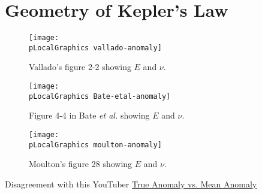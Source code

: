 % 

\section{Geometry of Kepler's Law}
\label{sec:geo}

\begin{figure}[htbp] %
\centering
\begin{center}
   \texttt{[image: \\pLocalGraphics vallado-anomaly]} 
   \caption{Vallado's figure 2-2 showing $E$ and $\nu$.}
\end{center}
   \label{fig:anomaly-vallado}
\end{figure}

\begin{figure}[htbp] %
\begin{center}
   \texttt{[image: \\pLocalGraphics Bate-etal-anomaly]} 
   \caption{Figure 4-4 in Bate \emph{et al.}  showing $E$ and $\nu$.}
\end{center}
   \label{fig:anomaly-bate}
\end{figure}

\begin{figure}[htbp] %
   \centering
   \texttt{[image: \\pLocalGraphics moulton-anomaly]} 
   \caption{Moulton's figure 28 showing $E$ and $\nu$.}
   \label{fig:anomaly-mouton}
\end{figure}


Disagreement with this YouTuber \href{https://www.youtube.com/watch?v=cf9Jh44kL20}{True Anomaly vs. Mean Anomaly}

\endinput  %
